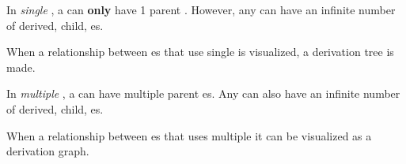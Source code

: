 \begin{definition}\label{def:OOP_Single_Inheritance}
  In \emph{single }, a  can \textbf{only} have 1 parent .
  However, any  can have an infinite number of derived, child, es.

  When a relationship between es that use single  is visualized, a derivation tree is made.
\end{definition}

\begin{definition}\label{def:OOP_Multiple_Inheritance}
  In \emph{multiple }, a  can have multiple parent es.
  Any  can also have an infinite number of derived, child, es.

  When a relationship between es that uses multiple  it can be visualized as a derivation graph.
\end{definition}


